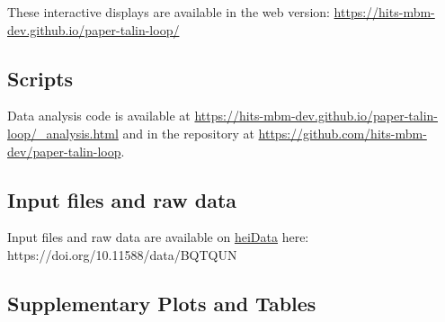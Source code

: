 \documentclass[
  twocolumn]{biophys-new-mod}
\begin{document}
These interactive displays are available in the web version:
\url{https://hits-mbm-dev.github.io/paper-talin-loop/}

\hypertarget{scripts}{%
\subsection{Scripts}\label{scripts}}

Data analysis code is available at
\url{https://hits-mbm-dev.github.io/paper-talin-loop/_analysis.html} and
in the repository at
\url{https://github.com/hits-mbm-dev/paper-talin-loop}.

\hypertarget{sec-data}{%
\subsection{Input files and raw data}\label{sec-data}}

Input files and raw data are available on
\href{https://heidata.uni-heidelberg.de/}{heiData} here:
https://doi.org/10.11588/data/BQTQUN

\hypertarget{supplementary-plots-and-tables}{%
\subsection{Supplementary Plots and
Tables}\label{supplementary-plots-and-tables}}
\end{document}
